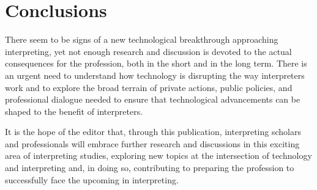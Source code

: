 \documentclass[output=paper]{langsci/langscibook}
\begin{document}
\section{Conclusions} 
 
There seem to be signs of a new technological breakthrough approaching interpreting, yet not enough research and discussion is devoted to the actual consequences for the profession, both in the short and in the long term. There is an urgent need to understand how technology is disrupting the way interpreters work and to explore the broad terrain of private actions, public policies, and professional dialogue needed to ensure that technological advancements can be shaped to the benefit of interpreters. 

It is the hope of the editor that, through this publication, interpreting scholars and professionals will embrace further research and discussions in this exciting area of interpreting studies, exploring new topics at the intersection of technology and interpreting and, in doing so, contributing to preparing the profession to successfully face the upcoming  in interpreting.  

\sloppy
\printbibliography[heading=subbibliography,notkeyword=this]
\end{document}
